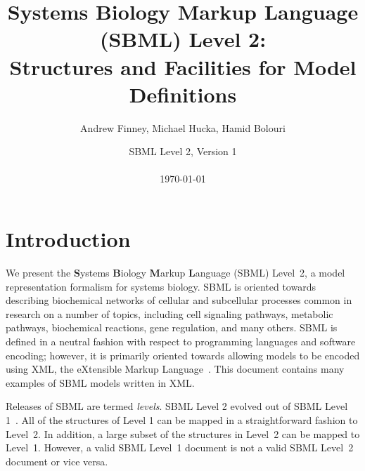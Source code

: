 \documentclass[10pt,twocolumntoc]{cekarticle}
\begin{document}

\title{Systems Biology Markup Language (SBML) Level 2:\\
  Structures and Facilities for Model Definitions}

\author{Andrew Finney, Michael Hucka, Hamid Bolouri}


\address{Systems Biology Workbench Development Group\\
  ERATO Kitano Systems Biology Project\\
  Control and Dynamical Systems, MC 107-81\\
  California Institute of Technology, Pasadena, CA 91125, USA\\[3pt]
  \url{http://www.cds.caltech.edu/erato}}


\date{SBML Level 2, Version 1\\[5pt]\\[5pt]
  \today{}}

\maketitlepage


\section{Introduction}
\label{sec:introduction}

We present the \textbf{S}ystems \textbf{B}iology \textbf{M}arkup
\textbf{L}anguage (SBML) Level~2, a model representation formalism for
systems biology.  SBML is oriented towards describing biochemical networks
of cellular and subcellular processes common in research on a number of
topics, including cell signaling pathways, metabolic pathways, biochemical
reactions, gene regulation, and many others.  SBML is defined in a neutral
fashion with respect to programming languages and software encoding;
however, it is primarily oriented towards allowing models to be encoded
using XML, the eXtensible Markup Language~\citep{bosak:1999,bray:2000}.
This document contains many examples of SBML models written in XML.

Releases of SBML are termed \emph{levels}.  SBML Level 2 evolved out of
SBML Level 1~\citep{hucka:2001}.  All of the structures of Level 1 can be
mapped in a straightforward fashion to Level~2.  In addition, a large
subset of the structures in Level~2 can be mapped to Level~1.  However, a
valid SBML Level~1 document is not a valid SBML Level~2 document or vice
versa.
\end{document}
